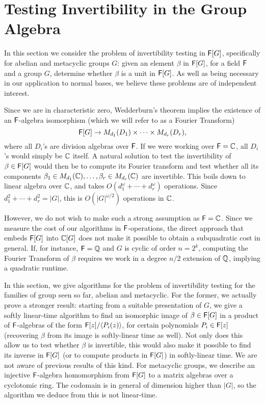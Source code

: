 \section{Testing Invertibility in the Group Algebra}
\label{sec:invertibility}

In this section we consider the problem of invertibility testing in
${\mathsf{F}}[G]$, specifically for abelian and metacyclic groups $G$: given an
element $\beta$ in ${\mathsf{F}}[G]$, for a field ${\mathsf{F}}$ and a group $G$, determine
whether $\beta$ is a unit in ${\mathsf{F}}[G]$.  As well as being necessary in our
application to normal bases, we believe these problems are of independent
interest.

Since we are in characteristic zero, Wedderburn's theorem implies the
existence of an ${\mathsf{F}}$-algebra isomorphism (which we will refer to as a
Fourier Transform)
\[
  {\mathsf{F}}[G] \to M_{d_1}(D_1) \times \dots \times M_{d_r}(D_r),
\]
where all $D_i$'s are division algebras over ${\mathsf{F}}$. If we were working over
${\mathsf{F}}=\mathbb{C}$, all $D_i$'s would simply be $\mathbb{C}$ itself.  A natural solution
to test the invertibility of $\beta \in {\mathsf{F}}[G]$ would then be to compute its
Fourier transform and test whether all its components
$\beta_1 \in M_{d_1}(\mathbb{C}),\dots,\beta_r \in M_{d_r}(\mathbb{C})$ are
invertible. This boils down to linear algebra over $\mathbb{C}$, and takes
$O(d_1^\omega + \cdots + d_r^\omega)$ operations.  Since
$d_1^2 + \cdots + d_r^2 = |G|$, this is $O(|G|^{\omega/2})$ operations in
$\mathbb{C}$.

However, we do not wish to make such a strong assumption as ${\mathsf{F}}=\mathbb{C}$. Since
we measure the cost of our algorithms in ${\mathsf{F}}$-operations, the direct
approach that embeds ${\mathsf{F}}[G]$ into $\mathbb{C}[G]$ does not make it possible to
obtain a subquadratic cost in general. If, for instance, ${\mathsf{F}}=\mathbb{Q}$ and $G$ is
cyclic of order $n=2^k$, computing the Fourier Transform of $\beta$
requires we work in a degree $n/2$ extension of $\mathbb{Q}$, implying a quadratic
runtime.

In this section, we give algorithms for the problem of invertibility
testing for the families of group seen so far, abelian and metacyclic. For
the former, we actually prove a stronger result: starting from a suitable
presentation of $G$, we give a softly linear-time algorithm to find an
isomorphic image of $\beta \in {\mathsf{F}}[G]$ in a product of ${\mathsf{F}}$-algebras of the
form ${\mathsf{F}}[z]/\langle P_i(z)\rangle$, for certain polynomials $P_i \in {\mathsf{F}}[z]$
(recovering $\beta$ from its image is softly-linear time as well). Not only
does this allow us to test whether $\beta$ is invertible, this would also
make it possible to find its inverse in ${\mathsf{F}}[G]$ (or to compute products in
${\mathsf{F}}[G]$) in softly-linear time.  We are not aware of previous results of
this kind. For metacyclic groups, we describe an injective ${\mathsf{F}}$-algebra
homomorphism from ${\mathsf{F}}[G]$ to a matrix algebras over a cyclotomic ring. The
codomain is in general of dimension higher than $|G|$, so the algorithm we
deduce from this is not linear-time.

